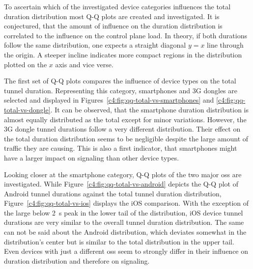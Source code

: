 To ascertain which of the investigated device categories influences the total duration distribution most Q-Q plots are created and investigated. It is conjectured, that the amount of influence on the duration distribution is correlated to the influence on the control plane load. In theory, if both durations follow the same distribution, one expects a straight diagonal $y=x$ line through the origin. A steeper incline indicates more compact regions in the distribution plotted on the $x$ axis and vice verse.

The first set of Q-Q plots compares the influence of device types on the total tunnel duration. Representing this category, smartphones and \gls{3G} dongles are selected and displayed in Figures~\ref{c4:fig:qq-total-vs-smartphones} and \ref{c4:fig:qq-total-vs-dongle}.
It can be observed, that the smartphone duration distribution is almost equally distributed as the total except for minor variations. However, the \gls{3G} dongle tunnel durations follow a very different distribution. Their effect on the total duration distribution seems to be negligible despite the  large amount of traffic they are causing. This is also a first indicator, that smartphones might have a larger impact on signaling than other device types.

Looking closer at the smartphone category, Q-Q plots of the two major \glspl{os} are investigated. While Figure~\ref{c4:fig:qq-total-vs-android} depicts the Q-Q plot of Android tunnel durations against the total tunnel duration distribution,  Figure~\ref{c4:fig:qq-total-vs-ios} displays the iOS comparison. With the exception of the large below \SI{2}{\second} peak in the lower tail of the distribution, iOS device tunnel durations are very similar to the overall tunnel duration distribution. The same can not be said about the Android distribution, which deviates somewhat in the distribution's center but is similar to the total distribution in the upper tail. Even devices with just a different \glspl{os} seem to strongly differ in their influence on duration distribution and therefore on signaling.


